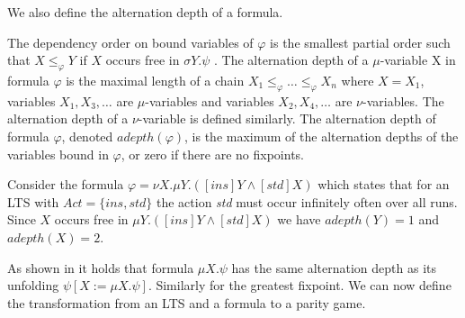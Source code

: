 We also define the alternation depth of a formula.
\begin{definition}
	The dependency order on bound variables of $\varphi$	is the smallest partial order such that $X \leq_\varphi Y$ if $X$ occurs free in $\sigma Y. \psi$ . The alternation depth of a $\mu$-variable X in formula $\varphi $ is the maximal length of a chain $X_1 \leq_\varphi  \dots \leq_\varphi X_n$ where $X = X_1$, variables $X_1, X_3, \dots$ are $\mu$-variables and variables $X_2, X_4, \dots$ are $\nu$-variables. The alternation depth of a $\nu$-variable is defined similarly. The alternation depth of formula $\varphi$, denoted $adepth(\varphi)$, is the maximum of the alternation depths of the variables bound in $\varphi$, or zero if there are no fixpoints.
\end{definition}
\begin{example}
	Consider the formula $\varphi = \nu X. \mu Y. ([ins]Y \wedge [std] X)$ which states that for an LTS with $Act = \{ ins, std\}$ the action \textit{std} must occur infinitely often over all runs. Since $X$ occurs free in $\mu Y. ([ins] Y \wedge [std]X)$ we have $adepth(Y) = 1$ and $adepth(X) = 2$.
\end{example}
As shown in \cite{Bradfield2018} it holds that formula $\mu X. \psi$ has the same alternation depth as its unfolding $\psi[X:=\mu X. \psi]$. Similarly for the greatest fixpoint. We can now define the transformation from an LTS and a formula to a parity game.
